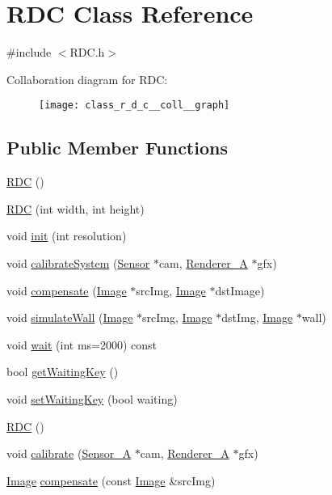 \hypertarget{class_r_d_c}{\section{R\-D\-C Class Reference}
\label{class_r_d_c}
}


{\ttfamily \#include $<$R\-D\-C.\-h$>$}



Collaboration diagram for R\-D\-C\-:\nopagebreak
\begin{figure}[H]
\begin{center}
\leavevmode
\texttt{[image: class\_r\_d\_c\_\_coll\_\_graph]}
\end{center}
\end{figure}
\subsection*{Public Member Functions}
\begin{DoxyCompactItemize}
\item 
\hyperlink{class_r_d_c_a609ab17eb672a23a49c00f853785c0b1}{R\-D\-C} ()
\item 
\hyperlink{class_r_d_c_a2f266b7215ade29eb5f4ecd3882ee475}{R\-D\-C} (int width, int height)
\item 
void \hyperlink{class_r_d_c_a4cce740ee5b8b5a56dad854acdf2ba9b}{init} (int resolution)
\item 
void \hyperlink{class_r_d_c_a520a27505dafa3ded833045ca748207c}{calibrate\-System} (\hyperlink{class_sensor}{Sensor} $\ast$cam, \hyperlink{class_renderer___a}{Renderer\-\_\-\-A} $\ast$gfx)
\item 
void \hyperlink{class_r_d_c_a6345820b0dc9fd9c63440eb7f69ec4c9}{compensate} (\hyperlink{class_image}{Image} $\ast$src\-Img, \hyperlink{class_image}{Image} $\ast$dst\-Image)
\item 
void \hyperlink{class_r_d_c_abaa34773cddd4c9d59f6beefed42289a}{simulate\-Wall} (\hyperlink{class_image}{Image} $\ast$src\-Img, \hyperlink{class_image}{Image} $\ast$dst\-Img, \hyperlink{class_image}{Image} $\ast$wall)
\item 
void \hyperlink{class_r_d_c_a54f036329e0267703c9bba536a3dc8c7}{wait} (int ms=2000) const 
\item 
bool \hyperlink{class_r_d_c_a470abc7b60568295a64bd800477fe535}{get\-Waiting\-Key} ()
\item 
void \hyperlink{class_r_d_c_af73a1c18834bf4a842de6fd8d231565d}{set\-Waiting\-Key} (bool waiting)
\item 
\hyperlink{class_r_d_c_a609ab17eb672a23a49c00f853785c0b1}{R\-D\-C} ()
\item 
void \hyperlink{class_r_d_c_a70face7e6f7c3f65772614fca001a52e}{calibrate} (\hyperlink{class_sensor___a}{Sensor\-\_\-\-A} $\ast$cam, \hyperlink{class_renderer___a}{Renderer\-\_\-\-A} $\ast$gfx)
\item 
\hyperlink{class_image}{Image} \hyperlink{class_r_d_c_afd4c8763d879d5c811ed1329d1ab12a2}{compensate} (const \hyperlink{class_image}{Image} \&src\-Img)
\end{DoxyCompactItemize}


